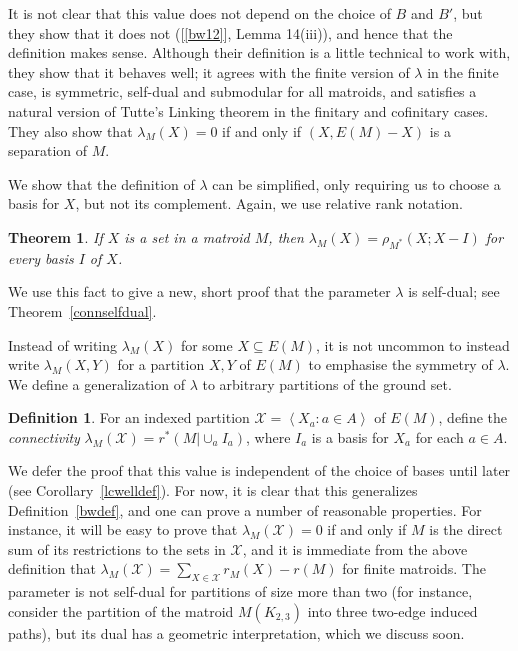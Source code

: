 \documentclass{amsart}
\theoremstyle{plain}
\newtheorem{theorem}{Theorem}[section]
\newcounter{defn}
\theoremstyle{definition}
\newtheorem{definition}[defn]{Definition}
\newcommand{\cX}{\mathcal{X}}
\newcommand{\ab}[1]{\left\langle#1\right\rangle}
\renewcommand{\ss}{\subseteq}
\newcommand{\relrank}[3]{\rho_{#1}({#2};{#3})}
\begin{document}
It is not clear that this value does not depend on the choice of $B$ and $B'$, 
but they show that it does not ([\ref{bw12}], Lemma 14(iii)), and hence that the definition makes sense. 
Although their definition is a little technical to work with, they show that it behaves well; 
it agrees with the finite version of $\lambda$ in the finite case, is symmetric, self-dual and submodular for all matroids, 
and satisfies a natural version of Tutte's Linking theorem in the finitary and cofinitary cases. 
They also show that $\lambda_M(X) = 0$ if and only if $(X, E(M)-X)$ is a separation of $M$. 

We show that the definition of $\lambda$ can be simplified, only requiring us to choose a basis for $X$, 
but not its complement. Again, we use relative rank notation. 

\begin{theorem}\label{shortconndef}
  If $X$ is a set in a matroid $M$, then $\lambda_M(X) = \relrank{M^*}{X}{X-I}$ 
  for every basis $I$ of $X$.
\end{theorem}

We use this fact to give a new, short proof that the parameter $\lambda$ is self-dual; 
see Theorem~\ref{connselfdual}. 

Instead of writing $\lambda_M(X)$ for some $X \ss E(M)$, it is not uncommon to instead write $\lambda_M(X,Y)$
for a partition $X,Y$ of $E(M)$ to emphasise the symmetry of $\lambda$. 
We define a generalization of $\lambda$ to arbitrary partitions of the ground set. 
\begin{definition}\label{gencon}
  For an indexed partition $\cX = \ab{X_a : a \in A}$ of $E(M)$, 
  define the \emph{connectivity} $\lambda_M(\cX) = r^*(M | \cup_a I_a)$, where $I_a$ is a basis for $X_a$ for each $a \in A$. 
\end{definition}

We defer the proof that this value is independent of the choice of bases 
until later (see Corollary~\ref{lcwelldef}). 
For now, it is clear that this generalizes Definition~\ref{bwdef}, 
and one can prove a number of reasonable properties. 
For instance, it will be easy to prove that $\lambda_{M}(\cX) = 0$ 
if and only if $M$ is the direct sum of
its restrictions to the sets in $\cX$, 
and it is immediate from the above definition that 
$\lambda_M(\cX) = \sum_{X \in \cX} r_M(X) - r(M)$ for finite matroids.
The parameter is not self-dual for partitions of size more than two
(for instance, consider the partition of the matroid $M(K_{2,3})$ into three two-edge induced paths), 
but its dual has a geometric interpretation, which we discuss soon.
\end{document}
